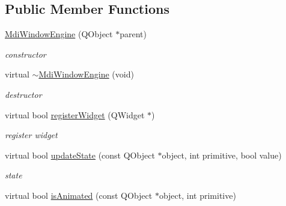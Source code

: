 \subsection*{Public Member Functions}
\begin{DoxyCompactItemize}
\item 
\mbox{\label{class_mdi_window_engine_a765c4d44f468ceebc758d4872f4bf47a}} 
\hyperlink{class_mdi_window_engine_a765c4d44f468ceebc758d4872f4bf47a}{Mdi\+Window\+Engine} (Q\+Object $\ast$parent)
\begin{DoxyCompactList}\small\item\em constructor \end{DoxyCompactList}\item 
\mbox{\label{class_mdi_window_engine_a2f37d5d4f6a452222d779655dc511756}} 
virtual \hyperlink{class_mdi_window_engine_a2f37d5d4f6a452222d779655dc511756}{$\sim$\+Mdi\+Window\+Engine} (void)
\begin{DoxyCompactList}\small\item\em destructor \end{DoxyCompactList}\item 
\mbox{\label{class_mdi_window_engine_afc63e614cb857c15b0546b1630cdecd6}} 
virtual bool \hyperlink{class_mdi_window_engine_afc63e614cb857c15b0546b1630cdecd6}{register\+Widget} (Q\+Widget $\ast$)
\begin{DoxyCompactList}\small\item\em register widget \end{DoxyCompactList}\item 
\mbox{\label{class_mdi_window_engine_a6fa11e84369a02021810444f3e382870}} 
virtual bool \hyperlink{class_mdi_window_engine_a6fa11e84369a02021810444f3e382870}{update\+State} (const Q\+Object $\ast$object, int primitive, bool value)
\begin{DoxyCompactList}\small\item\em state \end{DoxyCompactList}\item 
\mbox{\label{class_mdi_window_engine_a25ba9a512a7cd10eb0314db9ee584022}} 
virtual bool \hyperlink{class_mdi_window_engine_a25ba9a512a7cd10eb0314db9ee584022}{is\+Animated} (const Q\+Object $\ast$object, int primitive)

\end{DoxyCompactItemize}
